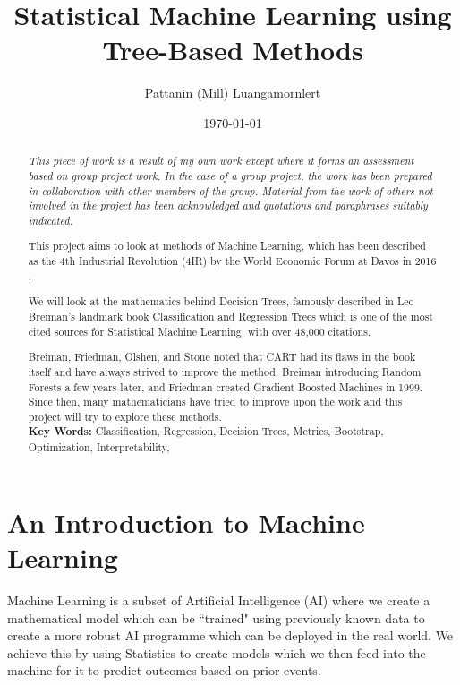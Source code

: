 \documentclass[11pt,a4paper]{report}
\title{Statistical Machine Learning using Tree-Based Methods}
\author{Pattanin (Mill) Luangamornlert}
\date{\today}
\begin{document}
\maketitle

\begin{abstract}
    \emph{This piece of work is a result of my own work except where it forms an assessment based on group project work. In the case of a group project, the work has been prepared in collaboration with other members of the group. Material from the work of others not involved in the project has been acknowledged and quotations and paraphrases suitably indicated.}
    \bigskip
    
    This project aims to look at methods of Machine Learning, which has been described as the 4th Industrial Revolution (4IR) by the World Economic Forum at Davos in 2016 \cite{Schwab}.
    
    We will look at the mathematics behind Decision Trees, famously described in Leo Breiman's landmark book Classification and Regression Trees \cite{BreimanDT} which is one of the most cited sources for Statistical Machine Learning, with over 48,000 citations.
    
    Breiman, Friedman, Olshen, and Stone noted that CART had its flaws in the book itself and have always strived to improve the method, Breiman introducing Random Forests a few years later, and Friedman created Gradient Boosted Machines in 1999. Since then, many mathematicians have tried to improve upon the work and this project will try to explore these methods.
    \bigskip\\
    \textbf{Key Words:} Classification, Regression, Decision Trees, Metrics, Bootstrap, Optimization, Interpretability,
    
    
    
\end{abstract}




\tableofcontents
\listofalgorithms
\listoffigures


\chapter{An Introduction to Machine Learning}
Machine Learning is a subset of Artificial Intelligence (AI) where we create a mathematical model which can be ``trained" using previously known data to create a more robust AI programme which can be deployed in the real world.
We achieve this by using Statistics to create models which we then feed into the machine for it to predict outcomes based on prior events.
\end{document}
